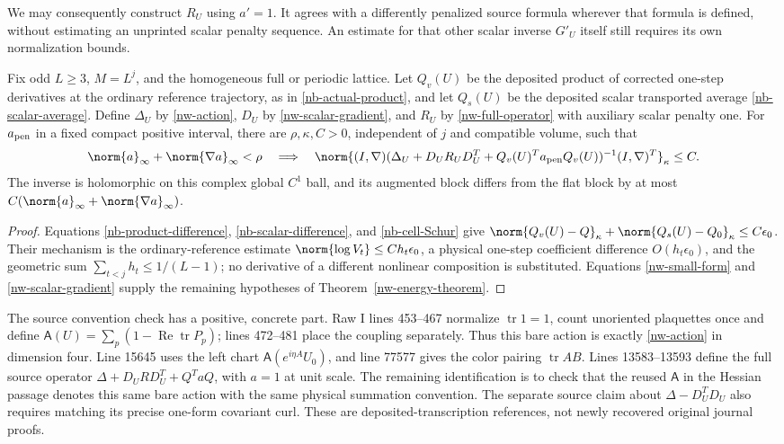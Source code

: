 We may consequently construct $R_U$ using $a'=1$.
It agrees with a differently penalized source formula wherever
that formula is defined, without estimating an unprinted scalar
penalty sequence. An estimate for that other scalar inverse
$G'_U$ itself still requires its own normalization bounds.

\begin{corollary}\label{nw-wilson-corollary}
Fix odd $L\ge3$, $M=L^j$, and the homogeneous full or periodic
lattice. Let $Q_v(U)$ be the deposited product of corrected
one-step derivatives at the ordinary reference trajectory, as
in \eqref{nb-actual-product}, and let $Q_s(U)$ be the deposited
scalar transported average \eqref{nb-scalar-average}.
Define $\Delta_U$ by \eqref{nw-action}, $D_U$ by
\eqref{nw-scalar-gradient}, and $R_U$ by
\eqref{nw-full-operator} with auxiliary scalar penalty one.
For $a_{\rm pen}$ in a fixed compact positive interval, there are
$\rho,\kappa,C>0$, independent of $j$ and compatible volume, such that
\begin{equation}\label{nw-final}
 \norm{a}_\infty+\norm{\nabla a}_\infty<\rho
 \quad\Longrightarrow\quad
 \norm{(I,\nabla)
 (\Delta_U+D_UR_UD_U^T+Q_v(U)^Ta_{\rm pen}Q_v(U))^{-1}
 (I,\nabla)^T}_\kappa\le C.
\end{equation}
The inverse is holomorphic on this complex global $C^1$ ball,
and its augmented block differs from the flat block by at most
$C(\norm{a}_\infty+\norm{\nabla a}_\infty)$.
\end{corollary}

\begin{proof}
Equations \eqref{nb-product-difference},
\eqref{nb-scalar-difference}, and \eqref{nb-cell-Schur}
give $\norm{Q_v(U)-Q}_\kappa+\norm{Q_s(U)-Q_0}_\kappa
\le C\epsilon_0$.
Their mechanism is the ordinary-reference estimate
$\norm{\log V_t}\le Ch_t\epsilon_0$, a physical one-step
coefficient difference $O(h_t\epsilon_0)$, and the geometric
sum $\sum_{t<j}h_t\le1/(L-1)$; no derivative of a different
nonlinear composition is substituted.
Equations \eqref{nw-small-form} and \eqref{nw-scalar-gradient}
supply the remaining hypotheses of Theorem~\ref{nw-energy-theorem}.
\end{proof}

The source convention check has a positive, concrete part.
Raw I lines 453--467 normalize $\operatorname{tr}1=1$, count
unoriented plaquettes once and define
$\mathsf A(U)=\sum_p(1-\operatorname{Re}\operatorname{tr}P_p)$;
lines 472--481 place the coupling separately. Thus this bare action
is exactly \eqref{nw-action} in dimension four.
Line 15645 uses the left chart $\mathsf A(e^{i\eta A}U_0)$,
and line 77577 gives the color pairing $\operatorname{tr}AB$.
Lines 13583--13593 define the full source operator
$\Delta+D_URD_U^T+Q^TaQ$, with $a=1$ at unit scale.
The remaining identification is to check that the reused
$\mathsf A$ in the Hessian passage denotes this same bare action
with the same physical summation convention. The separate source
claim about $\Delta-D_U^TD_U$ also requires matching its precise
one-form covariant curl. These are deposited-transcription
references, not newly recovered original journal proofs.

